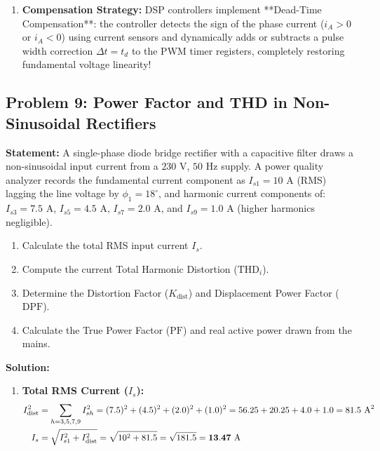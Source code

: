 \documentclass[11pt,a4paper]{article}
\begin{document}
\begin{examplebox}
\begin{enumerate}
  \item \textbf{Compensation Strategy:}
  DSP controllers implement **Dead-Time Compensation**: the controller detects the sign of the phase current ($i_A > 0$ or $i_A < 0$) using current sensors and dynamically adds or subtracts a pulse width correction $\Delta t = t_d$ to the PWM timer registers, completely restoring fundamental voltage linearity!
\end{enumerate}
\end{examplebox}

\subsection{Problem 9: Power Factor and THD in Non-Sinusoidal Rectifiers}
\begin{examplebox}
\textbf{Statement:} A single-phase diode bridge rectifier with a capacitive filter draws a non-sinusoidal input current from a $230\text{ V}$, $50\text{ Hz}$ supply. A power quality analyzer records the fundamental current component as $I_{s1} = 10\text{ A}$ (RMS) lagging the line voltage by $\phi_1 = 18^\circ$, and harmonic current components of: $I_{s3} = 7.5\text{ A}$, $I_{s5} = 4.5\text{ A}$, $I_{s7} = 2.0\text{ A}$, and $I_{s9} = 1.0\text{ A}$ (higher harmonics negligible).
\begin{enumerate}
  \item Calculate the total RMS input current $I_s$.
  \item Compute the current Total Harmonic Distortion ($\text{THD}_i$).
  \item Determine the Distortion Factor ($K_{\text{dist}}$) and Displacement Power Factor ($\text{DPF}$).
  \item Calculate the True Power Factor ($\text{PF}$) and real active power drawn from the mains.
\end{enumerate}

\tcblower
\textbf{Solution:}
\begin{enumerate}
  \item \textbf{Total RMS Current ($I_s$):}
  \begin{align*}
  I_{\text{dist}}^2 &= \sum_{h=3,5,7,9} I_{sh}^2 = (7.5)^2 + (4.5)^2 + (2.0)^2 + (1.0)^2 = 56.25 + 20.25 + 4.0 + 1.0 = 81.5\text{ A}^2 \notag\\
  I_s &= \sqrt{I_{s1}^2 + I_{\text{dist}}^2} = \sqrt{10^2 + 81.5} = \sqrt{181.5} = \mathbf{13.47\text{ A}}
  \end{align*}


\end{enumerate}
\end{examplebox}
\end{document}
